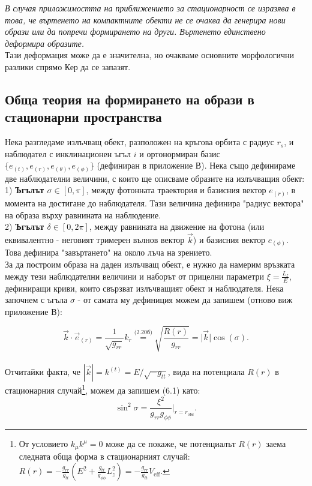 \emph{В случая приложимостта на приближението за стационарност се изразява в това, че въртенето на компактните обекти не се очаква да генерира нови образи или да попречи формирането на други. Въртенето единствено деформира образите.}\\

Тази деформация може да е значителна, но очакваме основните морфологични разлики спрямо Кер да се запазят.

\subsection{Обща теория на формирането на образи в стационарни пространства}

Нека разгледаме излъчващ обект, разположен на кръгова орбита с радиус $r_s$, и наблюдател с инклинационен ъгъл $i$ и ортонормиран базис $\{e_{(t)}, e_{(r)}, e_{(\theta)}, e_{(\phi)}\}$ (дефиниран в приложение В). Нека също дефинираме две наблюдателни величини, с които ще описваме образите на излъчващия обект:\\

1) \textbf{Ъгълът $\sigma\in[0,\pi]$}, между фотонната траектория и базисния вектор $e_{(r)}$, в момента на достигане до наблюдателя. Тази величина дефинира "радиус вектора" на образа върху равнината на наблюдение.\\

2) \textbf{Ъгълът $\delta\in[0,2\pi]$}, между равнината на движение на фотона (или еквивалентно - неговият тримерен вълнов вектор $\vec{k}$) и базисния вектор $e_{(\phi)}$. Това дефинира "завъртането" на около лъча на зрението.\\

За да построим образа на даден излъчващ обект, е нужно да намерим връзката между тези наблюдателни величини и наборът от прицелни параметри $\xi = \frac{L_z}{E}$, дефиниращи криви, които свързват излъчващият обект и наблюдателя. Нека започнем с ъгъла $\sigma$ - от самата му дефиниция можем да запишем (отново виж приложение В):

\begin{equation}
	\vec{k} \cdot \vec{e}_{(r)} = \frac{1}{\sqrt{g_{rr}}}k_{r} \stackrel{\text{(2.20б)}}{=} \sqrt{\frac{R(r)}{g_{rr}}} =  \big\vert \vec{k}\big\vert \cos(\sigma).
\end{equation}\\
Отчитайки факта, че $|\vec{k}| = k^{(t)} = E/\sqrt{-g_{tt}}$,  вида на потенциала $R(r)$ в стационарния случай\footnote{От условието $k_\mu k^\mu = 0$ може да се покаже, че потенциалът $R(r)$ заема следната обща форма в стационарният случай: $R(r) = -\frac{g_{rr}}{g_{tt}}\left(E^2 + \frac{g_{tt}}{g_{\phi\phi}}L_z^2\right) = -\frac{g_{rr}}{g_{tt}} V_\text{eff}$.}, можем да запишем (6.1) като:
\begin{equation}
	\sin^2\sigma = \frac{\xi^2}{g_{rr}g_{\phi\phi}}\bigg\vert_{r = r_\text{obs}}.
\end{equation}

